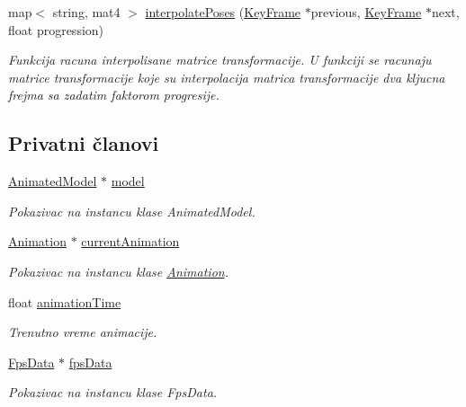 \begin{DoxyCompactItemize}
map$<$ string, mat4 $>$ \hyperlink{classanimation_1_1Animator_a263a7e899c2df14b37d733f020412f54}{interpolate\+Poses} (\hyperlink{classanimation_1_1KeyFrame}{Key\+Frame} $\ast$previous, \hyperlink{classanimation_1_1KeyFrame}{Key\+Frame} $\ast$next, float progression)
\begin{DoxyCompactList}\small\item\em Funkcija racuna interpolisane matrice transformacije. U funkciji se racunaju matrice transformacije koje su interpolacija matrica transformacije dva kljucna frejma sa zadatim faktorom progresije. \end{DoxyCompactList}\end{DoxyCompactItemize}
\subsection*{Privatni članovi}
\begin{DoxyCompactItemize}
\item 
\hyperlink{classmodel_1_1AnimatedModel}{Animated\+Model} $\ast$ \hyperlink{classanimation_1_1Animator_a5578ef87b7bf69b4434dcf916c279714}{model}
\begin{DoxyCompactList}\small\item\em Pokazivac na instancu klase Animated\+Model. \end{DoxyCompactList}\item 
\hyperlink{classanimation_1_1Animation}{Animation} $\ast$ \hyperlink{classanimation_1_1Animator_a97342956340bc49d17161b83ce72d6d1}{current\+Animation}
\begin{DoxyCompactList}\small\item\em Pokazivac na instancu klase \hyperlink{classanimation_1_1Animation}{Animation}. \end{DoxyCompactList}\item 
float \hyperlink{classanimation_1_1Animator_a39bfb15584fa3389f2314188f92f92d9}{animation\+Time}
\begin{DoxyCompactList}\small\item\em Trenutno vreme animacije. \end{DoxyCompactList}\item 
\hyperlink{classutility_1_1FpsData}{Fps\+Data} $\ast$ \hyperlink{classanimation_1_1Animator_a865e52c4c069f203f847fbd98b86c52a}{fps\+Data}
\begin{DoxyCompactList}\small\item\em Pokazivac na instancu klase Fps\+Data. \end{DoxyCompactList}\end{DoxyCompactItemize}


